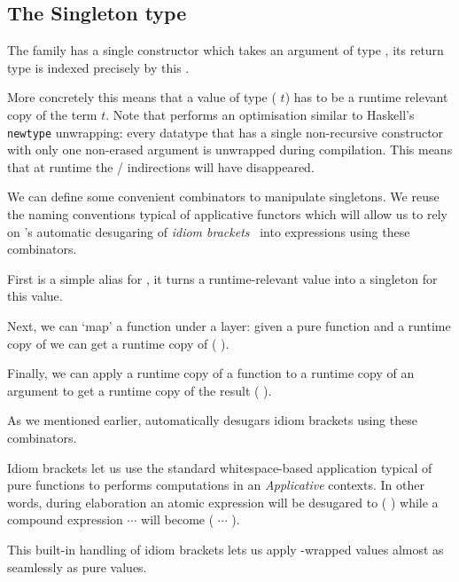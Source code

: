 
\subsection{The Singleton type}\label{sec:datasingleton}

The  family has a single constructor
which takes an argument  of type ,
its return type is indexed precisely by this .


More concretely this means that a value of type
( $t$) has to be a runtime relevant
copy of the term $t$.
%
Note that \idris{} performs an optimisation similar to Haskell's
\texttt{newtype} unwrapping: every datatype that has a single
non-recursive constructor with only one non-erased argument
is unwrapped during compilation.
%
This means that at runtime the
 /  indirections
will have disappeared.

We can define some convenient combinators to manipulate
singletons.
%
We reuse the naming conventions typical of applicative
functors which will allow us to rely on \idris{}'s automatic
desugaring of \emph{idiom brackets}~\citep{DBLP:journals/jfp/McbrideP08}
into expressions using these combinators.

First  is a simple alias for ,
it turns a runtime-relevant value  into a singleton for
this value.


Next, we can `map' a function under a  layer: given
a pure function  and a runtime copy of  we
can get a runtime copy of ( ).


Finally, we can apply a runtime copy of a function 
to a runtime copy of an argument 
to get a runtime copy of the result ( ).


As we mentioned earlier, \idris{} automatically desugars idiom brackets
using these combinators.

\begin{remark}
  Idiom brackets let us use the standard whitespace-based application
  typical of pure functions to performs computations in an \emph{Applicative}
  contexts.
%
  In other words, during elaboration an atomic expression
  \IdrisKeyword{[|}  \IdrisKeyword{|]}
  will be desugared to ( )
  while a compound expression
  \IdrisKeyword{[|}   $\cdots$  \IdrisKeyword{|]}
  will become ( \IdrisFunction{<\$>}  \IdrisFunction{<*>} $\cdots$ \IdrisFunction{<*>} ).
\end{remark}

This built-in handling of idiom brackets lets us apply
-wrapped values almost as seamlessly
as pure values.
